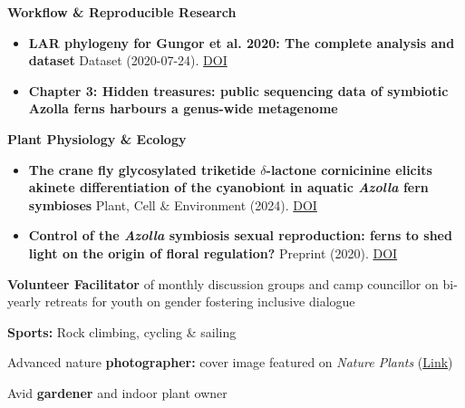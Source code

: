 \documentclass[a4paper,10pt]{article}
\begin{document}
\noindent\textbf{Workflow \& Reproducible Research}
  \begin{itemize}
    \item \textbf{LAR phylogeny for Gungor et al. 2020: The complete analysis and dataset}  
      Dataset (2020-07-24). \href{https://doi.org/10.5281/zenodo.3959057}{DOI}
    \item \textbf{Chapter 3: Hidden treasures: public sequencing data of symbiotic Azolla ferns harbours a genus-wide metagenome}
  \end{itemize}

\noindent\textbf{Plant Physiology \& Ecology}
  \begin{itemize}
    \item \textbf{The crane fly glycosylated triketide $\delta$-lactone cornicinine elicits akinete differentiation of the cyanobiont in aquatic \textit{Azolla} fern symbioses}  
      Plant, Cell \& Environment (2024). \href{https://doi.org/10.1111/pce.14907}{DOI}
    \item \textbf{Control of the \textit{Azolla} symbiosis sexual reproduction: ferns to shed light on the origin of floral regulation?}  
      Preprint (2020). \href{https://doi.org/10.3389/fpls.2021.693039}{DOI}
  \end{itemize}

\vfill

\begin{description}
  \raggedright
  \item \textbf{Volunteer Facilitator} of monthly discussion groups and camp councillor on bi-yearly retreats for youth on gender fostering inclusive dialogue
  \item \textbf{Sports:} Rock climbing, cycling \& sailing
  \item Advanced nature \textbf{photographer:} cover image featured on \emph{Nature Plants} (\href{https://lauralwd.github.io/photography/}{Link})
  \item Avid \textbf{gardener} and indoor plant owner
\end{description}
\end{document}
